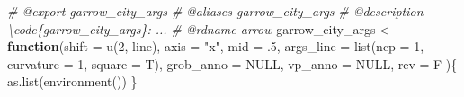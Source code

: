 \documentclass[
]{article}
\newenvironment{Shaded}{\begin{snugshade}}{\end{snugshade}}
\newcommand{\AttributeTok}[1]{\textcolor[rgb]{0.77,0.63,0.00}{#1}}
\newcommand{\CommentTok}[1]{\textcolor[rgb]{0.56,0.35,0.01}{\textit{#1}}}
\newcommand{\ConstantTok}[1]{\textcolor[rgb]{0.00,0.00,0.00}{#1}}
\newcommand{\ControlFlowTok}[1]{\textcolor[rgb]{0.13,0.29,0.53}{\textbf{#1}}}
\newcommand{\DecValTok}[1]{\textcolor[rgb]{0.00,0.00,0.81}{#1}}
\newcommand{\FunctionTok}[1]{\textcolor[rgb]{0.00,0.00,0.00}{#1}}
\newcommand{\NormalTok}[1]{#1}
\newcommand{\OtherTok}[1]{\textcolor[rgb]{0.56,0.35,0.01}{#1}}
\newcommand{\StringTok}[1]{\textcolor[rgb]{0.31,0.60,0.02}{#1}}
\begin{document}
\begin{Shaded}
\begin{Highlighting}[]
\CommentTok{\#\textquotesingle{} @export garrow\_city\_args}
\CommentTok{\#\textquotesingle{} @aliases garrow\_city\_args}
\CommentTok{\#\textquotesingle{} @description \textbackslash{}code\{garrow\_city\_args\}: ...}
\CommentTok{\#\textquotesingle{} @rdname arrow}
\NormalTok{garrow\_city\_args }\OtherTok{\textless{}{-}} 
  \ControlFlowTok{function}\NormalTok{(}\AttributeTok{shift =} \FunctionTok{u}\NormalTok{(}\DecValTok{2}\NormalTok{, line), }\AttributeTok{axis =} \StringTok{"x"}\NormalTok{, }\AttributeTok{mid =}\NormalTok{ .}\DecValTok{5}\NormalTok{,}
    \AttributeTok{args\_line =} \FunctionTok{list}\NormalTok{(}\AttributeTok{ncp =} \DecValTok{1}\NormalTok{, }\AttributeTok{curvature =} \DecValTok{1}\NormalTok{, }\AttributeTok{square =}\NormalTok{ T),}
    \AttributeTok{grob\_anno =} \ConstantTok{NULL}\NormalTok{, }\AttributeTok{vp\_anno =} \ConstantTok{NULL}\NormalTok{, }\AttributeTok{rev =}\NormalTok{ F}
\NormalTok{    )\{}
    \FunctionTok{as.list}\NormalTok{(}\FunctionTok{environment}\NormalTok{())}
\NormalTok{  \}}


\end{Highlighting}
\end{Shaded}
\end{document}
